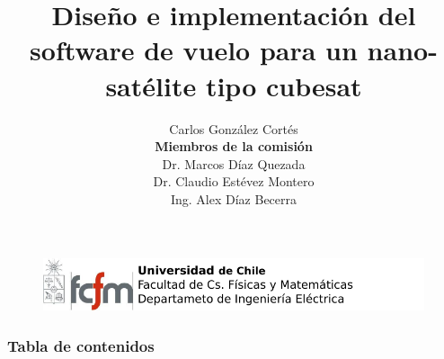 \documentclass[xcolor=dvipsnames]{beamer}
\title[Trabajo de título]{Diseño e implementación del software de vuelo para un nano-satélite tipo cubesat}
\author[Carlos González Cortés]{
\footnotesize
Carlos González Cortés\\
\vspace*{1cm}
\textbf{Miembros de la comisión}\\
Dr. Marcos Díaz Quezada\\
Dr. Claudio Estévez Montero\\
Ing. Alex Díaz Becerra}
\date[Universidad de Chile]{}
\institute[]{Universidad de Chile}
\begin{document}
	\begin{frame}[plain]
        \begin{figure}[t]
            \begin{flushleft}
				\includegraphics[scale=0.5]{img/logo.pdf}
            \end{flushleft}
        \end{figure}
        
		\titlepage
	\end{frame}

	\begin{frame}[shrink]
		\frametitle{Tabla de contenidos}
		\tableofcontents
	\end{frame}

\end{document}

